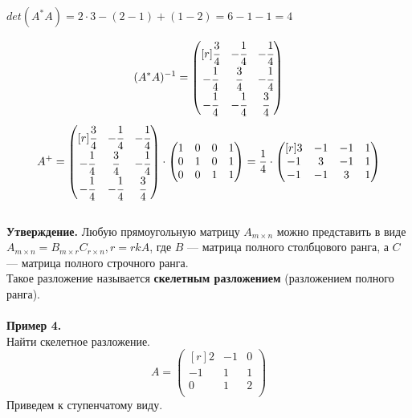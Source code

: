 \documentclass[12pt]{article}
\theoremstyle{definition}
\numberwithin{equation}{section}
\begin{document}
\begin{center}$det (A^*A)=2\cdot 3-(2-1)+(1-2)=6-1-1=4$\end{center}
\[(A^*A)^{-1} = \begin{pmatrix}[r]
\cfrac{3}{4} & -\cfrac{1}{4} & -\cfrac{1}{4} \\         
-\cfrac{1}{4} & \cfrac{3}{4} & -\cfrac{1}{4} \\
-\cfrac{1}{4} & -\cfrac{1}{4} & \cfrac{3}{4} \\
\end{pmatrix}\]
\[A^+ = \begin{pmatrix}[r]
\cfrac{3}{4} & -\cfrac{1}{4} & -\cfrac{1}{4} \\         
-\cfrac{1}{4} & \cfrac{3}{4} & -\cfrac{1}{4} \\
-\cfrac{1}{4} & -\cfrac{1}{4} & \cfrac{3}{4} \\
\end{pmatrix} \cdot \begin{pmatrix}
1 & 0 & 0 & 1 \\         
0 & 1 & 0 & 1\\
0 & 0 & 1 & 1\\
\end{pmatrix} = \frac{1}{4} \cdot \begin{pmatrix}[r]
3 & -1 & -1 & 1 \\         
-1 & 3 & - 1 & 1 \\
-1 & -1 & 3 & 1 \\
\end{pmatrix}\]\\
\textbf{Утверждение.}
Любую прямоугольную матрицу $A_{m \times n}$ можно представить в виде 
$A_{m \times n}=B_{m \times r}C_{r \times n}, r=rkA$, где $B$ --- матрица полного столбцового ранга, а $C$ --- матрица полного строчного ранга.\\
Такое разложение называется \textbf{скелетным разложением} (разложением полного ранга).\\ \\
\textbf{Пример 4.}\\
Найти скелетное разложение.\\
\[A = \begin{pmatrix}[r]
2 & -1 & 0 \\         
-1 & 1 & 1 \\
0 & 1 & 2 \\
\end{pmatrix}\]
Приведем к ступенчатому виду.\\
\end{document}

